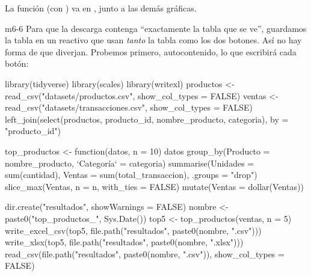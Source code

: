 
La función  (con ) va en
, junto a las demás gráficas.

\begin{solucion}{m6-6}
Para que la descarga contenga ``exactamente la tabla que se ve'', guardamos
la tabla en un reactivo que usan \emph{tanto} la tabla como los dos botones.
Así no hay forma de que diverjan. Probemos primero, autocontenido, lo que
escribirá cada botón:
\end{solucion}

\begin{rcode}
library(tidyverse)
library(scales)
library(writexl)
productos <- read_csv("datasets/productos.csv", show_col_types = FALSE)
ventas <- read_csv("datasets/transacciones.csv", show_col_types = FALSE) %
  left_join(select(productos, producto_id, nombre_producto, categoria),
            by = "producto_id")

top_productos <- function(datos, n = 10) {
  datos %
    group_by(Producto = nombre_producto, `Categoría` = categoria) %
    summarise(Unidades = sum(cantidad),
              Ventas   = sum(total_transaccion), .groups = "drop") %
    slice_max(Ventas, n = n, with_ties = FALSE) %
    mutate(Ventas = dollar(Ventas))
}

dir.create("resultados", showWarnings = FALSE)
nombre <- paste0("top_productos_", Sys.Date())
top5 <- top_productos(ventas, n = 5)
write_excel_csv(top5, file.path("resultados", paste0(nombre, ".csv")))
write_xlsx(top5, file.path("resultados", paste0(nombre, ".xlsx")))
read_csv(file.path("resultados", paste0(nombre, ".csv")),
         show_col_types = FALSE)
\end{rcode}

